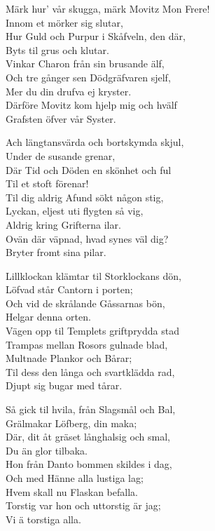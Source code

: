 \vspace{10pt}
Märk hur' vår skugga, märk Movitz Mon Frere!\\
Innom et mörker sig slutar,\\
Hur Guld och Purpur i Skåfveln, den där,\\
Byts til grus och klutar.\\
Vinkar Charon från sin brusande älf,\\
Och tre gånger sen Dödgräfvaren sjelf,\\
Mer du din drufva ej kryster.\\
Därföre Movitz kom hjelp mig och hvälf\\
Grafsten öfver vår Syster.\par
\vspace{10pt}
Ach längtansvärda och bortskymda skjul,\\
Under de susande grenar,\\
Där Tid och Döden en skönhet och ful\\
Til et stoft förenar!\\
Til dig aldrig Afund sökt någon stig,\\
Lyckan, eljest uti flygten så vig,\\
Aldrig kring Grifterna ilar.\\
Ovän där väpnad, hvad synes väl dig?\\
Bryter fromt sina pilar.\par
\vspace{10pt}
Lillklockan klämtar til Storklockans dön,\\
Löfvad står Cantorn i porten;\\
Och vid de skrålande Gåssarnas bön,\\
Helgar denna orten.\\
Vägen opp til Templets griftprydda stad\\
Trampas mellan Rosors gulnade blad,\\
Multnade Plankor och Bårar;\\
Til dess den långa och svartklädda rad,\\
Djupt sig bugar med tårar.\par
\vspace{10pt}
Så gick til hvila, från Slagsmål och Bal,\\
Grälmakar Löfberg, din maka;\\
Där, dit åt gräset långhalsig och smal,\\
Du än glor tilbaka.\\
Hon från Danto bommen skildes i dag,\\
Och med Hänne alla lustiga lag;\\
Hvem skall nu Flaskan befalla.\\
Torstig var hon och uttorstig är jag;\\
Vi ä torstiga alla.
